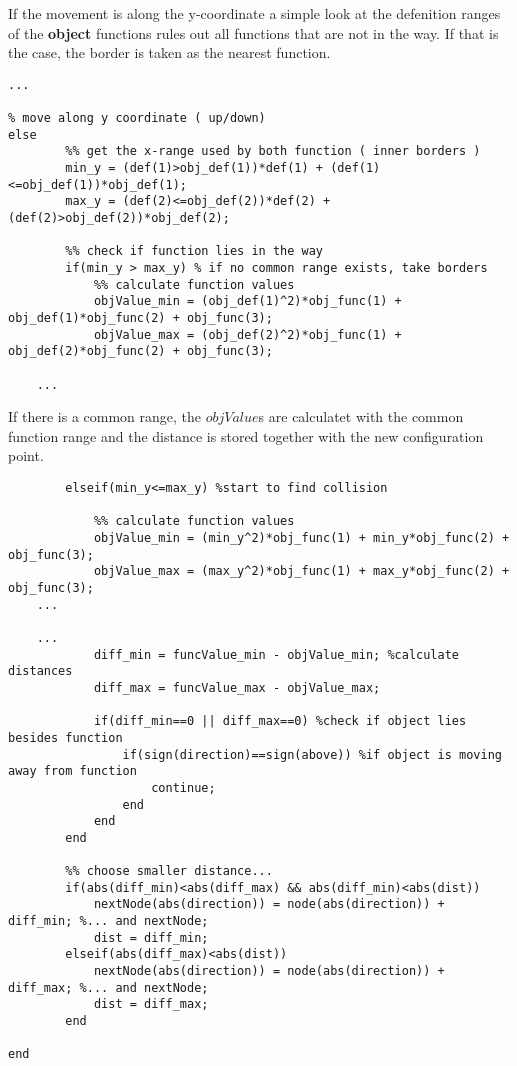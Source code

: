 If the movement is along the y-coordinate a simple look at the defenition ranges of the \textbf{object} functions rules out all functions that are not in the way.
If that is the case, the border is taken as the nearest function.
\begin{lstlisting}
...

% move along y coordinate ( up/down)
else
        %% get the x-range used by both function ( inner borders )
        min_y = (def(1)>obj_def(1))*def(1) + (def(1)<=obj_def(1))*obj_def(1);
        max_y = (def(2)<=obj_def(2))*def(2) + (def(2)>obj_def(2))*obj_def(2);
        
        %% check if function lies in the way
        if(min_y > max_y) % if no common range exists, take borders
            %% calculate function values
            objValue_min = (obj_def(1)^2)*obj_func(1) + obj_def(1)*obj_func(2) + obj_func(3);
            objValue_max = (obj_def(2)^2)*obj_func(1) + obj_def(2)*obj_func(2) + obj_func(3);
            
    ...
\end{lstlisting}
If there is a common range, the $objValue$s are calculatet with the common function range and the distance is stored together with the new configuration point.
\begin{lstlisting}
        elseif(min_y<=max_y) %start to find collision
            
            %% calculate function values
            objValue_min = (min_y^2)*obj_func(1) + min_y*obj_func(2) + obj_func(3);
            objValue_max = (max_y^2)*obj_func(1) + max_y*obj_func(2) + obj_func(3);
    ...

    ...
            diff_min = funcValue_min - objValue_min; %calculate distances
            diff_max = funcValue_max - objValue_max;
            
            if(diff_min==0 || diff_max==0) %check if object lies besides function
                if(sign(direction)==sign(above)) %if object is moving away from function
                    continue;
                end
            end
        end

        %% choose smaller distance...
        if(abs(diff_min)<abs(diff_max) && abs(diff_min)<abs(dist))
            nextNode(abs(direction)) = node(abs(direction)) + diff_min; %... and nextNode;
            dist = diff_min;
        elseif(abs(diff_max)<abs(dist))
            nextNode(abs(direction)) = node(abs(direction)) + diff_max; %... and nextNode;
            dist = diff_max;
        end
   
end
\end{lstlisting}

